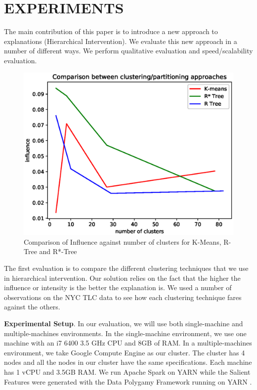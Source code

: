 \section{EXPERIMENTS}
\label{sec:evaluation}
The main contribution of this paper is to introduce a new approach to explanations (Hierarchical Intervention). We evaluate this new approach in a number of different ways. We perform qualitative evaluation and speed/scalability evaluation.

\begin{figure}[h]
	\includegraphics[width=0.96\columnwidth]{images/clustering_comparison}
	\caption{Comparison of Influence against number of clusters for K-Means, R-Tree and R*-Tree}
	\label{fig:clustering_comparison}
\end{figure}

The first evaluation is to compare the different clustering techniques that we use in hierarchical intervention. Our solution relies on the fact that the higher the influence or intensity is the better the explanation is. We used a number of observations on the NYC TLC data to see how each clustering technique fares against the others.

\textbf{Experimental Setup}. 
In our evaluation, we will use both single-machine and multiple-machines environments. 
In the single-machine environment, we use one machine with an i7 6400 3.5 GHz CPU and 8GB of RAM. 
In a multiple-machines environment, we take Google Compute Engine as our cluster. 
The cluster has 4 nodes and all the nodes in our cluster have the same specifications.
Each machine has 1 vCPU and 3.5GB RAM.
We run Apache Spark on YARN while the Salient Features were generated with the Data Polygamy Framework running on YARN \cite{chirigati2016data}. 

